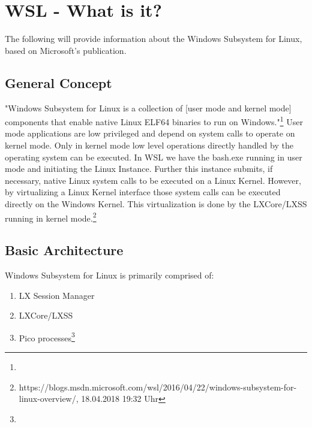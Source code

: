 \documentclass[utf8,biblatex]{lni}
\begin{document}
\section{WSL - What is it?}
The following will provide information about the Windows Subsystem for Linux, based on Microsoft's publication.

\subsection{General Concept}
"Windows Subsystem for Linux is a collection of [user mode and kernel mode] components that enable native Linux ELF64 binaries to run on Windows."\footnote{} User mode applications are low privileged and depend on system calls to operate on kernel mode. Only in kernel mode low level operations directly handled by the operating system can be executed. In WSL we have the bash.exe running in user mode and initiating the Linux Instance. Further this instance submits, if necessary, native Linux system calls to be executed on a Linux Kernel. However, by virtualizing a Linux Kernel interface those system calls can be executed directly on the Windows Kernel. This virtualization is done by the LXCore/LXSS running in kernel mode.\footnote{ https://blogs.msdn.microsoft.com/wsl/2016/04/22/windows-subsystem-for-linux-overview/, 18.04.2018 19:32 Uhr}

\subsection{Basic Architecture}

Windows Subsystem for Linux is primarily comprised of: 
\begin{enumerate}
    \item LX Session Manager
    \item LXCore/LXSS
    \item Pico processes\footnote{}
\end{enumerate}
\end{document}
